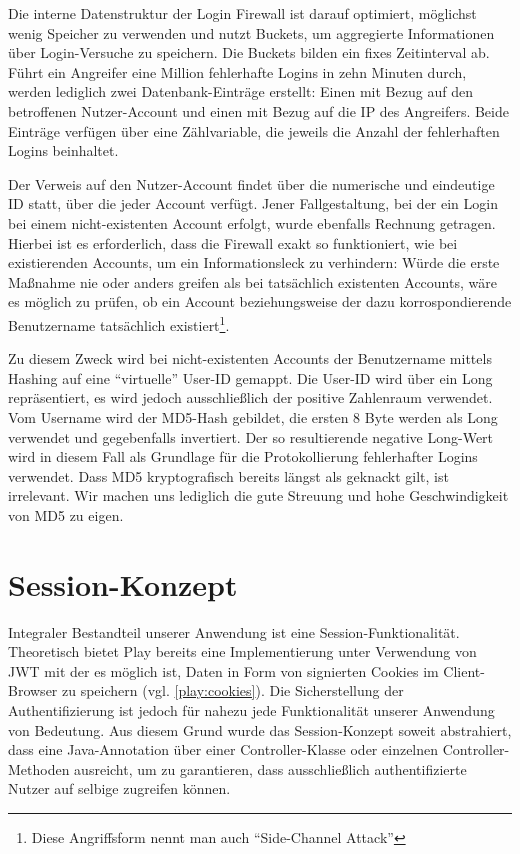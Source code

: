 \documentclass[12pt,DIV14,BCOR10mm,a4paper,parskip=half-,headsepline,headinclude,english,ngerman,bibliography=totocnumbered]{scrreprt}
\begin{document}
Die interne Datenstruktur der Login Firewall ist darauf optimiert, möglichst wenig Speicher zu verwenden und nutzt Buckets, um aggregierte Informationen über Login-Versuche zu speichern. Die Buckets bilden ein fixes Zeitinterval ab. Führt ein Angreifer eine Million fehlerhafte Logins in zehn Minuten durch, werden lediglich zwei Datenbank-Einträge erstellt: Einen mit Bezug auf den betroffenen Nutzer-Account und einen mit Bezug auf die IP des Angreifers. Beide Einträge verfügen über eine Zählvariable, die jeweils die Anzahl der fehlerhaften Logins beinhaltet.

Der Verweis auf den Nutzer-Account findet über die numerische und eindeutige ID statt, über die jeder Account verfügt. Jener Fallgestaltung, bei der ein Login bei einem nicht-existenten Account erfolgt, wurde ebenfalls Rechnung getragen. Hierbei ist es erforderlich, dass die Firewall exakt so funktioniert, wie bei existierenden Accounts, um ein Informationsleck zu verhindern: Würde die erste Maßnahme nie oder anders greifen als bei tatsächlich existenten Accounts, wäre es möglich zu prüfen, ob ein Account beziehungsweise der dazu korrospondierende Benutzername tatsächlich existiert\footnote{Diese Angriffsform nennt man auch \enquote{Side-Channel Attack}}.

Zu diesem Zweck wird bei nicht-existenten Accounts der Benutzername mittels Hashing auf eine \enquote{virtuelle} User-ID gemappt. Die User-ID wird über ein Long repräsentiert, es wird jedoch ausschließlich der positive Zahlenraum verwendet. Vom Username wird der MD5-Hash gebildet, die ersten 8 Byte werden als Long verwendet und gegebenfalls invertiert. Der so resultierende negative Long-Wert wird in diesem Fall als Grundlage für die Protokollierung fehlerhafter Logins verwendet. Dass MD5 kryptografisch bereits längst als geknackt gilt, ist irrelevant. Wir machen uns lediglich die gute Streuung und hohe Geschwindigkeit von MD5 zu eigen.

\section{Session-Konzept}
\label{sessionkonzept}
Integraler Bestandteil unserer Anwendung ist eine Session-Funktionalität. Theoretisch bietet Play bereits eine Implementierung unter Verwendung von JWT mit der es möglich ist, Daten in Form von signierten Cookies im Client-Browser zu speichern (vgl. \ref{play:cookies}). Die Sicherstellung der Authentifizierung ist jedoch für nahezu jede Funktionalität unserer Anwendung von Bedeutung. Aus diesem Grund wurde das Session-Konzept soweit abstrahiert, dass eine Java-Annotation über einer Controller-Klasse oder einzelnen Controller-Methoden ausreicht, um zu garantieren, dass ausschließlich authentifizierte Nutzer auf selbige zugreifen können.
\end{document}
